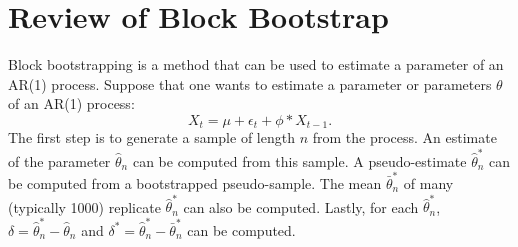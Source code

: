 \documentclass[12pt, letterpaper, titlepage]{article}
\begin{document}


\section{Review of Block Bootstrap}
\label{sec:blkbootreview}

Block bootstrapping is a method that can be used to estimate a parameter of an AR(1) process. Suppose that one wants to estimate a parameter or parameters $\theta$ of an AR(1) process: 
\[X_{t} = \mu + \epsilon_{t} + \phi*X_{t-1}.\] The first step is to generate a sample of length $n$ from the process. An estimate of the parameter $\hat{\theta}_{n}$ can be computed from this sample. A pseudo-estimate $\hat\theta_n^*$ can be computed from a bootstrapped pseudo-sample. The mean $\bar\theta_n^*$ of many (typically 1000) replicate $\hat\theta_n^*$ can also be computed. Lastly, for each $\hat\theta_n^*$, $\delta = \hat\theta_n^* - \hat{\theta}_{n}$ and $\delta^* = \hat\theta_n^* - \bar\theta_n^*$ can be computed.
\end{document}

